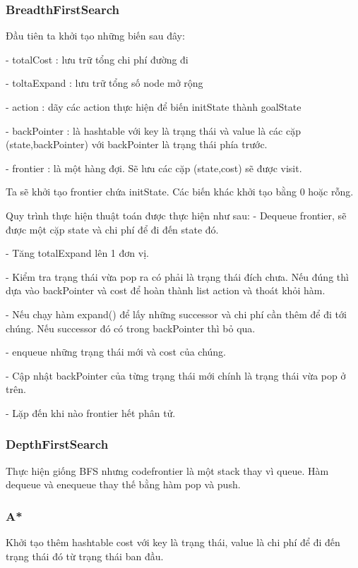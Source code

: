 \documentclass[11pt]{article} %
\begin{document}
\subsubsection{BreadthFirstSearch}
Đầu tiên ta khởi tạo những biến sau đây:  

- totalCost : lưu trữ tổng chi phí đường đi  

- toltaExpand : lưu trữ tổng số node mở rộng  

- action : dãy các action thực hiện để biến initState thành goalState  

- backPointer : là hashtable với key là trạng thái và value là các cặp (state,backPointer) với backPointer là trạng thái phía trước.  

- frontier : là một hàng đợi. Sẽ lưu các cặp (state,cost) sẽ được visit.  

Ta sẽ khởi tạo frontier chứa initState. Các biến khác khởi tạo bằng 0 hoặc rỗng.  

Quy trình thực hiện thuật toán được thực hiện như sau:
- Dequeue frontier, sẽ được một cặp state và chi phí để đi đến state đó.

- Tăng totalExpand lên 1 đơn vị.  

- Kiểm tra trạng thái vừa pop ra có phải là trạng thái đích chưa. Nếu đúng thì dựa vào backPointer và cost để hoàn thành list action và thoát khỏi hàm.  

- Nếu chạy hàm expand() để lấy những successor và chi phí cần thêm để đi tới chúng. Nếu successor đó có trong backPointer thì bỏ qua.

- enqueue những trạng thái mới và cost của chúng.

- Cập nhật backPointer của từng trạng thái mới chính là trạng thái vừa pop ở trên.

- Lặp đến khi nào frontier hết phân tử.

\subsubsection{DepthFirstSearch}

Thực hiện giống BFS nhưng code{frontier} là một stack thay vì queue. Hàm dequeue và enequeue thay thế bằng hàm pop và push.

\subsubsection{A*}
Khởi tạo thêm hashtable cost với key là trạng thái, value là chi phí để đi đến trạng thái đó từ trạng thái ban đầu.
\end{document}
